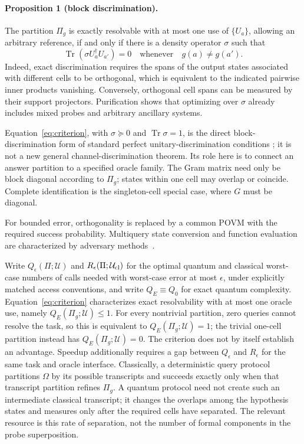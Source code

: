 \documentclass[
  aps,
  prl,
  reprint,
  nofootinbib
]{revtex4-2}
\begin{document}
\paragraph{Proposition 1 (block discrimination).}
The partition \(\Pi_g\) is exactly resolvable with at most one use of
\(\{U_a\}\), allowing an arbitrary reference, if and only if there is a
density operator \(\sigma\) such that
\begin{equation}
 \operatorname{Tr}\!\left(\sigma U_a^\dagger U_{a'}\right)=0
 \quad\text{whenever}\quad g(a)\ne g(a').
 \label{eq:criterion}
\end{equation}
Indeed, exact discrimination requires the spans of the output states
associated with different cells to be orthogonal, which is equivalent to the
indicated pairwise inner products vanishing. Conversely, orthogonal cell
spans can be measured by their support projectors. Purification shows that
optimizing over \(\sigma\) already includes mixed probes and arbitrary
ancillary systems.

Equation~\eqref{eq:criterion}, with \(\sigma\succeq0\) and
\(\operatorname{Tr}\sigma=1\), is the direct block-discrimination form of
standard perfect unitary-discrimination conditions
\cite{Acin2001UnitaryDiscrimination,DuanFengYing2009}; it is not a new general
channel-discrimination theorem. Its role here is to connect an answer
partition to a specified oracle family. The Gram matrix need only be block
diagonal according to \(\Pi_g\); states within one cell may overlap or
coincide. Complete identification is the singleton-cell special case, where
\(G\) must be diagonal.

For bounded error, orthogonality is replaced by a common POVM with the required
success probability. Multiquery state conversion and function evaluation are
characterized by adversary methods~\cite{LeeEtAl2011StateConversion,
Reichardt2014SpanPrograms}.

Write \(Q_\epsilon(\Pi;\mathcal U)\) and
\(R_\epsilon(\Pi;\mathcal U_{\rm cl})\) for the optimal quantum and
classical worst-case numbers of calls needed with worst-case error at most
\(\epsilon\), under explicitly matched access conventions, and write
\(Q_E\equiv Q_0\) for exact quantum complexity.
Equation~\eqref{eq:criterion} characterizes exact resolvability with at most
one oracle use, namely \(Q_E(\Pi_g;\mathcal U)\le1\). For every nontrivial
partition, zero queries cannot resolve the task, so this is equivalent to
\(Q_E(\Pi_g;\mathcal U)=1\); the trivial one-cell partition instead has
\(Q_E(\Pi_g;\mathcal U)=0\). The criterion does not by itself establish an
advantage. Speedup additionally requires a gap between
\(Q_\epsilon\) and \(R_\epsilon\) for the same task and oracle interface.
Classically, a deterministic query protocol partitions \(\Omega\) by its
possible transcripts and succeeds exactly only when that transcript
partition refines \(\Pi_g\). A quantum protocol need not create such an
intermediate classical transcript; it changes the overlaps among the
hypothesis states and measures only after the required cells have separated.
The relevant resource is this rate of separation, not the number of formal
components in the probe superposition.
\end{document}
